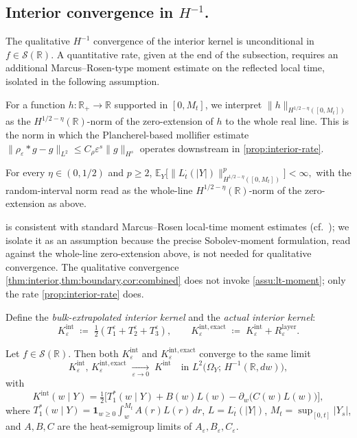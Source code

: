 \documentclass[EJP]{ejpecp}
\newcommand{\R}{\mathbb{R}}
\renewcommand{\E}{\mathbb{E}}
\begin{document}
\subsection*{Interior convergence in $H^{-1}$.}

The qualitative $H^{-1}$ convergence of the interior kernel is
unconditional in $f\in\mathscr S(\R)$. A quantitative rate, given
at the end of the subsection, requires an additional
Marcus--Rosen-type moment estimate on the reflected local time,
isolated in the following assumption.

For a function $h\colon\R_+\to\R$ supported in $[0,M_t]$, we
interpret $\|h\|_{H^{1/2-\eta}([0,M_t])}$ as the
$H^{1/2-\eta}(\R)$-norm of the zero-extension of $h$ to the whole
real line. This is the norm in which the Plancherel-based mollifier
estimate $\|\rho_\varepsilon*g-g\|_{L^{2}}\le C_\rho\varepsilon^{s}\|g\|_{H^{s}}$
operates downstream in \cref{prop:interior-rate}.

\begin{assumption}\label{assu:lt-moment}
For every $\eta\in(0,1/2)$ and $p\ge 2$,
\(
 \E_{Y}\bigl[\|L_{t}^{\cdot}(|Y|)\|_{H^{1/2-\eta}([0,M_{t}])}^{p}\bigr]<\infty,
\)
with the random-interval norm read as the whole-line
$H^{1/2-\eta}(\R)$-norm of the zero-extension as above.
\end{assumption}

 is consistent with standard Marcus--Rosen
local-time moment estimates (cf.~\cite{MarcusRosen}); we isolate it
as an assumption because the precise Sobolev-moment formulation,
read against the whole-line zero-extension above, is not needed for
qualitative convergence. The qualitative convergence
\cref{thm:interior,thm:boundary,cor:combined} does not invoke
\cref{assu:lt-moment}; only the rate \cref{prop:interior-rate} does.

Define the \emph{bulk-extrapolated interior kernel} and the
\emph{actual interior kernel}:
\[
 K_{\varepsilon}^{\mathrm{int}}\;\coloneqq\;\tfrac12(T_{1}^{\varepsilon}+T_{2}^{\varepsilon}+T_{3}^{\varepsilon}),
 \qquad
 K_{\varepsilon}^{\mathrm{int,exact}}\;\coloneqq\;K_{\varepsilon}^{\mathrm{int}}+R_{\varepsilon}^{\mathrm{layer}}.
\]

\begin{theorem}
\label{thm:interior}
Let $f\in\mathscr S(\R)$. Then both $K_{\varepsilon}^{\mathrm{int}}$
and $K_{\varepsilon}^{\mathrm{int,exact}}$ converge to the same limit
\[
 K_{\varepsilon}^{\mathrm{int}},\,K_{\varepsilon}^{\mathrm{int,exact}}
 \;\xrightarrow[\varepsilon\to 0]{}\;K^{\mathrm{int}}
 \quad\text{in }L^{2}\bigl(\Omega_{Y};\,H^{-1}(\R,dw)\bigr),
\]
with
\begin{equation}\label{eq:Kint-limit}
 K^{\mathrm{int}}(w\mid Y)
 =\tfrac12\bigl[T_{1}^{*}(w\mid Y)+B(w)L(w)-\partial_{w}\bigl(C(w)L(w)\bigr)\bigr],
\end{equation}
where $T_{1}^{*}(w\mid Y)=\mathbf 1_{w\ge 0}\int_{w}^{M_{t}}A(r)L(r)\,dr$,
$L=L_{t}^{\cdot}(|Y|)$, $M_{t}=\sup_{[0,t]}|Y_{s}|$, and $A,B,C$ are
the heat-semigroup limits of $A_\varepsilon,B_\varepsilon,C_\varepsilon$.
\end{theorem}
\end{document}
